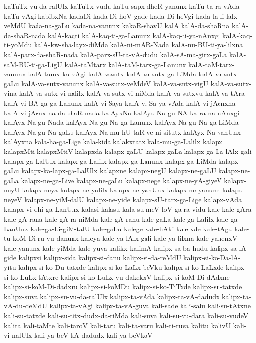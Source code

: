 {kaTuTx-vu-da-ralUlx
kaTuTx-vudu
kaTu-sapx-dheR-yanunx
kaTu-ta-ra-vAda
kaTu-vAgi
kabibxNa
kadaDi
kada-Di-hoV-gade
kada-Di-hoVgi
kada-la-li-lalx-veMdU
kada-na-gaLu
kada-na-vanunx
kakaR-shavU
kalA
kalA-da-shaRna
kalA-da-shaR-nada
kalA-kaqti
kalA-kaq-ti-ga-Lanunx
kalA-kaq-ti-ya-nAnxgi
kalA-kaq-ti-yoMdu
kalA-kw-sha-layx-diMda
kalA-ni-mAR-Nada
kalA-nu-BU-ti-ya-lilxna
kalA-parx-da-shaR-nada
kalA-parx-sU-ta-vA-dudu
kalA-sA-ma-girx-gaLa
kalA-saM-BU-ti-ga-LigU
kalA-taMtarx
kalA-taM-tarx-ga-Lanunx
kalA-taM-tarx-vanunx
kalA-tamx-ka-vAgi
kalA-vasutx
kalA-va-sutx-ga-LiMda
kalA-va-sutx-gaLu
kalA-va-sutx-vanunx
kalA-va-sutx-veMdeV
kalA-va-sutx-vigU
kalA-va-sutx-vina
kalA-va-sutx-vi-nalilx
kalA-va-sutx-vi-niMda
kalA-va-sutxvu
kalA-va-tAra
kalA-vi-BA-ga-ga-Lanunx
kalA-vi-Saya
kalA-vi-Sa-ya-vAda
kalA-vi-jAcnxna
kalA-vi-jAcnx-na-da-shaR-nada
kalAyxNa
kalAyx-Na-gu-NA-ka-ra-na-nAnxgi
kalAyx-Na-gu-Nada
kalAyx-Na-gu-Na-ga-Lanunx
kalAyx-Na-gu-Na-ga-LiMda
kalAyx-Na-gu-Na-gaLu
kalAyx-Na-mu-hU-taR-ve-ni-situtx
kalAyx-Na-vanUnx
kalAyxna
kala-ha-ga-Lige
kala-kida
kalakxtatx
kala-mu-ga-Lalilx
kalapx
kalapxMti
kalapxMtiV
kalapxda
kalapx-gaLU
kalapx-gaLa
kalapx-ga-La-lAlx-gali
kalapx-ga-LalUlx
kalapx-ga-Lalilx
kalapx-ga-Lanunx
kalapx-ga-LiMda
kalapx-gaLu
kalapx-ka-lapx-ga-LalUlx
kalapxne
kalapx-negU
kalapx-ne-gaLU
kalapx-ne-gaLa
kalapx-ne-ga-Live
kalapx-ne-gaLu
kalapx-nege
kalapx-ne-yA-giyeV
kalapx-neyU
kalapx-neya
kalapx-ne-yalilx
kalapx-ne-yanUnx
kalapx-ne-yanunx
kalapx-neyeV
kalapx-ne-yiM-dalU
kalapx-ne-yide
kalapx-sU-tarx-ga-Lige
kalapx-vAda
kalapx-vi-dhi-ga-LanUnx
kalasi
kalasu
kala-su-meV-loV-ga-ra-vidu
kale
kale-gAra
kale-gA-rana
kale-gA-ra-niMda
kale-gA-ranu
kale-gaLa
kale-ga-Lalilx
kale-ga-LanUnx
kale-ga-Li-giM-talU
kale-gaLu
kalege
kale-hAki
kalelxde
kale-tAga
kale-tu-koM-Di-ru-vu-danunx
kaleya
kale-ya-lAlx-gali
kale-ya-lilxna
kale-yanenxV
kale-yanunx
kale-yiMda
kale-yuva
kalikx
kalimA
kalipx-sa-ba-hudu
kalipx-sa-lA-gide
kalipxsi
kalipx-sida
kalipx-si-danu
kalipx-si-da-reMdU
kalipx-si-ko-Da-lA-yitu
kalipx-si-ko-Du-tatxde
kalipx-si-ko-LaLx-beVku
kalipx-si-ko-LaLxde
kalipx-si-ko-LuLx-tAtxre
kalipx-si-ko-LuLx-vu-dakekxV
kalipx-si-koM-Di-dAdxne
kalipx-si-koM-Di-dadxru
kalipx-si-koMDu
kalipx-si-ko-TiTxde
kalipx-su-tatxde
kalipx-suva
kalipx-su-vu-da-ralUlx
kalipx-ta-vAda
kalipx-ta-vA-dadudx
kalipx-ta-vA-du-deMdU
kalipx-ta-vAgi
kalipx-ta-vA-guva
kali-sade
kali-salu
kali-su-tAtxne
kali-su-tatxde
kali-su-titx-dudx-da-riMda
kali-suva
kali-su-vu-dara
kali-su-vudeV
kalita
kali-taMte
kali-taroV
kali-taru
kali-ta-varu
kali-ti-ruva
kalitu
kalivU
kali-vi-nalUlx
kali-ya-beV-kA-dadudx
kali-ya-beVkoV
}
